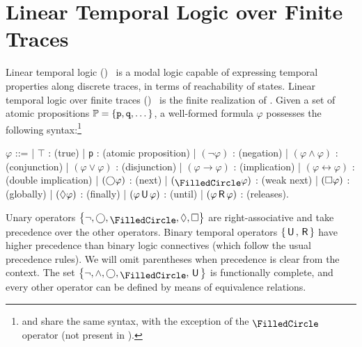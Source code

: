 \section{Linear Temporal Logic over Finite Traces}
Linear temporal logic (\LTL)~\cite{pnueli1977temporal} is a modal logic capable of expressing temporal properties along discrete traces, in terms of reachability of states.
Linear temporal logic over finite traces (\LTLf)~\cite{de2013linear} is the finite realization of \LTL.
Given a set of atomic propositions ${\mathbb{P}} = \left\{\texttt{p}, \texttt{q}, \dots\right\}$, a well-formed \LTLf formula $\varphi$ possesses the following syntax:\footnote{\LTLf and \LTL share the same syntax, with the exception of the $\ltlweaknext$ operator (not present in \LTL).}
\begin{center}
	\begin{bnf}
		$\varphi$ ::=
		| $\top$ : (true)
		| \texttt{p} : (atomic proposition)
		| $(\neg \varphi)$ : (negation)
		| $(\varphi \wedge \varphi)$ : (conjunction)
		| $(\varphi \vee \varphi)$ : (disjunction)
		| $(\varphi \rightarrow \varphi)$ : (implication)
		| $(\varphi \leftrightarrow \varphi)$ : (double implication)
		| $(\bigcirc \varphi)$ : (next)
		| $(\ltlweaknext \varphi)$ : (weak next)
		| $(\Box \varphi)$ : (globally)
		| $(\Diamond \varphi)$ : (finally)
		| $(\varphi \,\mathsf{U}\, \varphi)$ : (until)
		| $(\varphi \,\mathsf{R}\, \varphi)$ : (releases).
	\end{bnf}
\end{center}
Unary operators $\left\{\neg, \ltlnext, \ltlweaknext, \ltlfinally, \ltlglobally\right\}$ are right-associative and take precedence over the other operators. Binary temporal operators $\left\{\,\mathsf{U}\,, \,\mathsf{R}\,\right\}$ have higher precedence than binary logic connectives (which follow the usual precedence rules).
We will omit parentheses when precedence is clear from the context.
The set $\left\{\neg, \wedge, \ltlnext, \ltlweaknext, \ltluntil\right\}$ is functionally complete, and every other operator can be defined by means of equivalence relations.

